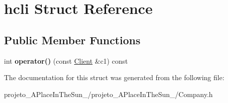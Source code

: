\hypertarget{structhcli}{}\section{hcli Struct Reference}
\label{structhcli}
\subsection*{Public Member Functions}
\begin{DoxyCompactItemize}
\item 
\hypertarget{structhcli_a8b23b7a2b08b6ff29a75083abe826293}{}\label{structhcli_a8b23b7a2b08b6ff29a75083abe826293} 
int {\bfseries operator()} (const \hyperlink{class_client}{Client} \&c1) const
\end{DoxyCompactItemize}


The documentation for this struct was generated from the following file\+:\begin{DoxyCompactItemize}
\item 
projeto\+\_\+\+A\+Place\+In\+The\+Sun\+\_/projeto\+\_\+\+A\+Place\+In\+The\+Sun\+\_/Company.\+h\end{DoxyCompactItemize}

